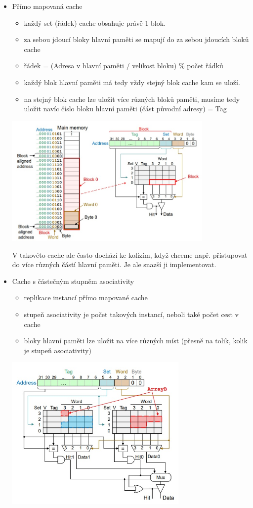 \begin{itemize}
	\item Přímo mapovaná cache
	\begin{itemize}
		\item každý set (řádek) cache obsahuje právě 1 blok.
		\item za sebou jdoucí bloky hlavní paměti se mapují do za sebou jdoucích bloků cache
		\item řádek = (Adresa v hlavní paměti / velikost bloku) \% počet řádků
		\item každý blok hlavní paměti má tedy vždy stejný blok cache kam se uloží.
		\item na stejný blok cache lze uložit více různých bloků paměti, musíme tedy uložit navíc číslo bloku hlavní paměti (část původní adresy) = Tag
	\end{itemize}
	
	\includegraphics[width=0.8\textwidth]{img/OB-5_0.jpg}
	
	V takovéto cache ale často dochází ke kolizím, když chceme např. přistupovat do více různých částí hlavní paměti. Je ale snazší ji implementovat.
	
	\item Cache s částečným stupněm asociativity
	
	\begin{itemize}
		\item replikace instancí přímo mapované cache
		\item stupeň asociativity je počet takových instancí, neboli také počet cest v cache
		\item bloky hlavní paměti lze uložit na více různých míst (přesně na tolik, kolik je stupeň asociativity)
	\end{itemize}
	
	\includegraphics[width=0.7\textwidth]{img/OB-5_1.jpg}
	

\end{itemize}
